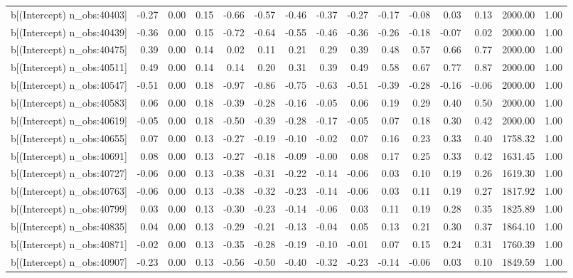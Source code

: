 \begin{table}[ht]
\begin{tabular}{rrrrrrrrrrrrrrr}
  b[(Intercept) n\_obs:40403] & -0.27 & 0.00 & 0.15 & -0.66 & -0.57 & -0.46 & -0.37 & -0.27 & -0.17 & -0.08 & 0.03 & 0.13 & 2000.00 & 1.00 \\ 
  b[(Intercept) n\_obs:40439] & -0.36 & 0.00 & 0.15 & -0.72 & -0.64 & -0.55 & -0.46 & -0.36 & -0.26 & -0.18 & -0.07 & 0.02 & 2000.00 & 1.00 \\ 
  b[(Intercept) n\_obs:40475] & 0.39 & 0.00 & 0.14 & 0.02 & 0.11 & 0.21 & 0.29 & 0.39 & 0.48 & 0.57 & 0.66 & 0.77 & 2000.00 & 1.00 \\ 
  b[(Intercept) n\_obs:40511] & 0.49 & 0.00 & 0.14 & 0.14 & 0.20 & 0.31 & 0.39 & 0.49 & 0.58 & 0.67 & 0.77 & 0.87 & 2000.00 & 1.00 \\ 
  b[(Intercept) n\_obs:40547] & -0.51 & 0.00 & 0.18 & -0.97 & -0.86 & -0.75 & -0.63 & -0.51 & -0.39 & -0.28 & -0.16 & -0.06 & 2000.00 & 1.00 \\ 
  b[(Intercept) n\_obs:40583] & 0.06 & 0.00 & 0.18 & -0.39 & -0.28 & -0.16 & -0.05 & 0.06 & 0.19 & 0.29 & 0.40 & 0.50 & 2000.00 & 1.00 \\ 
  b[(Intercept) n\_obs:40619] & -0.05 & 0.00 & 0.18 & -0.50 & -0.39 & -0.28 & -0.17 & -0.05 & 0.07 & 0.18 & 0.30 & 0.42 & 2000.00 & 1.00 \\ 
  b[(Intercept) n\_obs:40655] & 0.07 & 0.00 & 0.13 & -0.27 & -0.19 & -0.10 & -0.02 & 0.07 & 0.16 & 0.23 & 0.33 & 0.40 & 1758.32 & 1.00 \\ 
  b[(Intercept) n\_obs:40691] & 0.08 & 0.00 & 0.13 & -0.27 & -0.18 & -0.09 & -0.00 & 0.08 & 0.17 & 0.25 & 0.33 & 0.42 & 1631.45 & 1.00 \\ 
  b[(Intercept) n\_obs:40727] & -0.06 & 0.00 & 0.13 & -0.38 & -0.31 & -0.22 & -0.14 & -0.06 & 0.03 & 0.10 & 0.19 & 0.26 & 1619.30 & 1.00 \\ 
  b[(Intercept) n\_obs:40763] & -0.06 & 0.00 & 0.13 & -0.38 & -0.32 & -0.23 & -0.14 & -0.06 & 0.03 & 0.11 & 0.19 & 0.27 & 1817.92 & 1.00 \\ 
  b[(Intercept) n\_obs:40799] & 0.03 & 0.00 & 0.13 & -0.30 & -0.23 & -0.14 & -0.06 & 0.03 & 0.11 & 0.19 & 0.28 & 0.35 & 1825.89 & 1.00 \\ 
  b[(Intercept) n\_obs:40835] & 0.04 & 0.00 & 0.13 & -0.29 & -0.21 & -0.13 & -0.04 & 0.05 & 0.13 & 0.21 & 0.30 & 0.37 & 1864.10 & 1.00 \\ 
  b[(Intercept) n\_obs:40871] & -0.02 & 0.00 & 0.13 & -0.35 & -0.28 & -0.19 & -0.10 & -0.01 & 0.07 & 0.15 & 0.24 & 0.31 & 1760.39 & 1.00 \\ 
  b[(Intercept) n\_obs:40907] & -0.23 & 0.00 & 0.13 & -0.56 & -0.50 & -0.40 & -0.32 & -0.23 & -0.14 & -0.06 & 0.03 & 0.10 & 1849.59 & 1.00 \\ 

\end{tabular}
\end{table}

